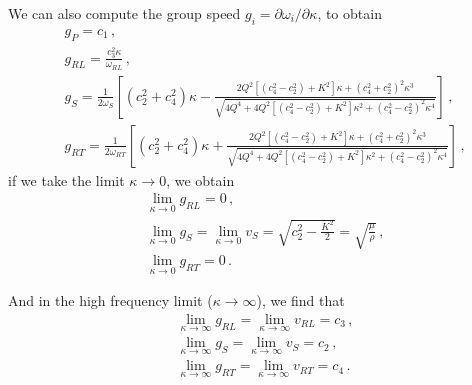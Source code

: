 \documentclass[12pt]{article}
\begin{document}
We can also compute the group speed \(g_i = \partial \omega_i/\partial \kappa\), to obtain
\begin{align}
&g_P = c_1 \, ,\\
&g_{RL} = \frac{c_3^2 \kappa}{\omega_{RL}}\, ,\\
&g_S = \frac{1}{2\omega_S}\left[(c_2^2 + c_4^2)\kappa - \frac{2Q^2[(c_4^2 - c_2^2) + K^2]\kappa + (c_4^2 + c_2^2)^2\kappa^3}{\sqrt{4Q^4 + 4Q^2[(c_4^2 - c_2^2) + K^2]\kappa^2 + (c_4^2 - c_2^2)^2 \kappa^4}}\right] \, ,\\
&g_{RT} = \frac{1}{2\omega_{RT}}\left[(c_2^2 + c_4^2)\kappa + \frac{2Q^2[(c_4^2 - c_2^2) + K^2]\kappa + (c_4^2 + c_2^2)^2\kappa^3}{\sqrt{4Q^4 +  4Q^2[(c_4^2 - c_2^2) + K^2]\kappa^2 + (c_4^2 - c_2^2)^2 \kappa^4}}\right]\, ,
\end{align}
if we take the limit \(\kappa \rightarrow 0\), we obtain
\begin{align*}
&\lim_{\kappa \rightarrow 0}g_{RL} = 0\, ,\\
&\lim_{\kappa \rightarrow 0}g_S = \lim_{\kappa \rightarrow 0} v_S = \sqrt{c_2^2 - \frac{K^2}{2}}=\sqrt{\frac{\mu}{\rho}}\, ,\\
&\lim_{\kappa \rightarrow 0}g_{RT} = 0\, .
\end{align*}

And in the high frequency limit (\(\kappa \rightarrow \infty\)), we find that
\begin{align*}
&\lim_{\kappa \rightarrow \infty}g_{RL} = \lim_{\kappa \rightarrow \infty}v_{RL} = c_3\, ,\\
&\lim_{\kappa \rightarrow \infty}g_S = \lim_{\kappa \rightarrow \infty}v_S = c_2\, ,\\
&\lim_{\kappa \rightarrow \infty}g_{RT} = \lim_{\kappa \rightarrow \infty}v_{RT} = c_4\, .
\end{align*}
\end{document}
